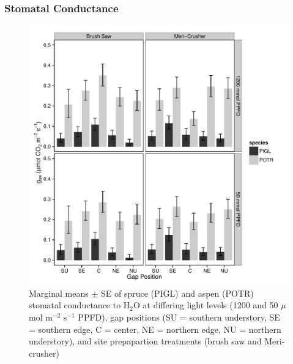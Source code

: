 \documentclass{article}\usepackage[]{graphicx}\usepackage[]{color}
\makeatletter
\def\maxwidth{ %
  \ifdim\Gin@nat@width>\linewidth
    \linewidth
  \else
    \Gin@nat@width
  \fi
}
\newenvironment{knitrout}{}{} %
\makeatother
\begin{document}
\subsubsection{Stomatal Conductance}
\begin{knitrout}
\color{fgcolor}\begin{figure}[]

\includegraphics[width=\maxwidth]{figure/gs_plot} \caption[Marginal means $\pm$ SE of spruce (PIGL) and aspen (POTR) stomatal conductance to H$_2$O at differing light levels (1200 and 50 $\mu$mol m$^{-2}$ s$^{-1}$ PPFD), gap positions (SU = southern understory, SE = southern edge, C = center, NE = northern edge, NU = northern understory), and site prepapartion treatments (brush saw and Meri-crusher)]{Marginal means $\pm$ SE of spruce (PIGL) and aspen (POTR) stomatal conductance to H$_2$O at differing light levels (1200 and 50 $\mu$mol m$^{-2}$ s$^{-1}$ PPFD), gap positions (SU = southern understory, SE = southern edge, C = center, NE = northern edge, NU = northern understory), and site prepapartion treatments (brush saw and Meri-crusher)\label{fig:gs_plot}}
\end{figure}


\end{knitrout}
\end{document}
